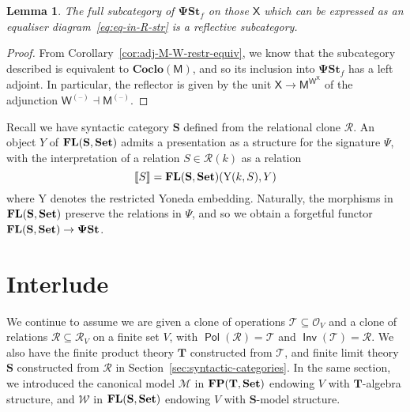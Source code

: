 \documentclass[11pt, a4paper, twoside,leqno]{amsart}
\newcommand{\cat}[1]{\mathbf{#1}}
\newcommand{\thg}{{\mathord{\text{--}}}}
\newcommand{\dbr}[1]{\left\llbracket{#1}\right\rrbracket}
\renewcommand{\O}{{\mathcal O}}
\newcommand{\R}{{\mathcal R}}
\numberwithin{equation}{section}
\theoremstyle{plain}
\newtheorem{Lemma}[Thm]{Lemma}
\theoremstyle{definition}
\newcommand{\Set}{\cat{Set}}
\DeclareMathOperator{\FP}{\bf FP}
\DeclareMathOperator{\FL}{\bf FL}
\DeclareMathOperator{\Pol}{\mathsf{Pol}}
\DeclareMathOperator{\Inv}{\mathsf{Inv}}
\newcommand{\yo}{\text{\usefont{U}{min}{m}{n}\symbol{'210}}}
\begin{document}
\begin{Lemma}
  \label{lem:cocloMop-refl-subcat-psi}
  The full subcategory of \(\cat{\Psi St}_{f}\) on
  those $\mathsf{X}$ which can be expressed as an equaliser
  diagram~\eqref{eq:eq-in-R-str} is a reflective subcategory.
\end{Lemma}

\begin{proof}
  From Corollary~\ref{cor:adj-M-W-restr-equiv}, we know that the
  subcategory described
  is equivalent to \(\cat{Coclo}(\mathsf{M})\),
  and so its inclusion into \(\cat{\Psi St}_{f}\) has a left adjoint. In
  particular, the reflector is given by the unit $\mathsf{X}
  \rightarrow \mathsf{M}^{\mathsf{W}^{\mathsf{X}}}$ of the adjunction
  $\mathsf{W}^{(\thg)} \dashv \mathsf{M}^{(\thg)}$.
\end{proof}


Recall we have syntactic category \(\cat{S}\) defined from the
relational clone \(\mathscr{R}\). An object \(Y\) of
\(\FL(\cat{S},\Set)\) admits a presentation as
a structure for the signature \(\Psi\), with the interpretation of a
relation \(S \in \mathscr{R}(k)
\) as a relation
\begin{equation*}
  \dbr{S} =
  \FL(\cat{S},\Set)(\mathrm{Y}
  (k,S),Y)
\end{equation*}
where \(\mathrm{Y}
\) denotes
the restricted Yoneda embedding. Naturally, the morphisms in
\(\FL(\cat{S},\Set)\) preserve the relations in
\(\Psi\), and so we obtain a forgetful functor \(\FL(\cat{S},\Set)
\rightarrow \cat{\Psi St}\).


\section{Interlude}
\label{sec:interlude}

We continue to assume we are given a clone of operations \(\mathscr{T}
\subseteq \O_{V}\) and a clone of
relations \(\mathscr{R}
\subseteq \R_{V}\) on a finite set \(V\), with  \(\Pol(\mathscr{R}
) = \mathscr{T}
\) and \(\Inv(\mathscr{T}
) = \mathscr{R}
\). We also have the finite product theory
\(\cat{T}\) constructed from \(\mathscr{T}
\), and finite limit theory \(\cat{S}\) constructed from
\(\mathscr{R}\) in Section~\ref{sec:syntactic-categories}. In the
same section, we introduced the canonical model \(\mathcal{M}\) in
\(\FP(\cat{T},\Set)\) endowing \(V\) with \(\cat{T}\)-algebra
structure, and \(\mathcal{W}\) in \(\FL(\cat{S}, \cat{Set})\) endowing \(V\) with \(\cat{S}\)-model
structure.
\end{document}
